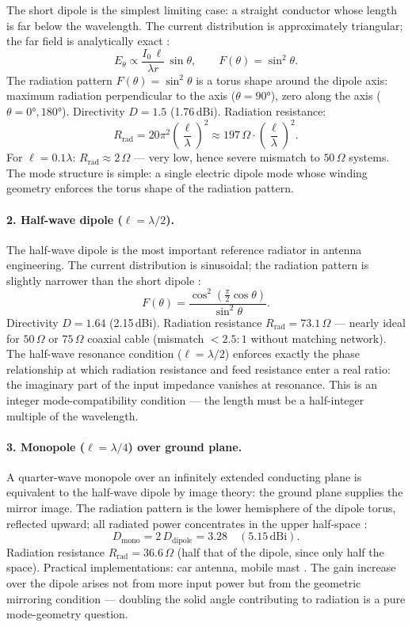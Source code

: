 The short dipole is the simplest limiting case: a straight conductor whose
length is far below the wavelength. The current distribution is
approximately triangular; the far field is analytically exact \EM:
\[
  E_\theta \propto \frac{I_0\,\ell}{\lambda r}\,\sin\theta,
  \qquad
  F(\theta) = \sin^2\theta.
\]
The radiation pattern $F(\theta) = \sin^2\theta$ is a torus shape around
the dipole axis: maximum radiation perpendicular to the axis
($\theta = 90°$), zero along the axis ($\theta = 0°, 180°$). Directivity
$D = 1.5$ (1.76\,dBi). Radiation resistance:
\[
  R_\mathrm{rad} = 20\pi^2\left(\frac{\ell}{\lambda}\right)^2 \approx 197\,\Omega
  \cdot \left(\frac{\ell}{\lambda}\right)^2.
\]
For $\ell = 0.1\lambda$: $R_\mathrm{rad} \approx 2\,\Omega$ --- very low,
hence severe mismatch to $50\,\Omega$ systems. The mode structure is simple:
a single electric dipole mode whose winding geometry enforces the torus
shape of the radiation pattern.

\paragraph{2. Half-wave dipole ($\ell = \lambda/2$).}

The half-wave dipole is the most important reference radiator in antenna
engineering. The current distribution is sinusoidal; the radiation pattern
is slightly narrower than the short dipole \EM:
\[
  F(\theta) = \frac{\cos^2\!\left(\frac{\pi}{2}\cos\theta\right)}{\sin^2\theta}.
\]
Directivity $D = 1.64$ (2.15\,dBi). Radiation resistance
$R_\mathrm{rad} = 73.1\,\Omega$ --- nearly ideal for $50\,\Omega$ or
$75\,\Omega$ coaxial cable (mismatch $< 2.5:1$ without matching network).
The half-wave resonance condition ($\ell = \lambda/2$) enforces exactly
the phase relationship at which radiation resistance and feed resistance
enter a real ratio: the imaginary part of the input impedance vanishes
at resonance. This is an integer mode-compatibility condition --- the
length must be a half-integer multiple of the wavelength.

\paragraph{3. Monopole ($\ell = \lambda/4$) over ground plane.}

A quarter-wave monopole over an infinitely extended conducting plane is
equivalent to the half-wave dipole by image theory: the ground plane
supplies the mirror image. The radiation pattern is the lower hemisphere
of the dipole torus, reflected upward; all radiated power concentrates in
the upper half-space \EM:
\[
  D_\mathrm{mono} = 2\,D_\mathrm{dipole} = 3.28 \quad (5.15\,\mathrm{dBi}).
\]
Radiation resistance $R_\mathrm{rad} = 36.6\,\Omega$ (half that of the
dipole, since only half the space). Practical implementations: car antenna,
mobile mast \cite{Balanis2016}. The gain increase over the dipole arises not
from more input power but from the geometric mirroring condition ---
doubling the solid angle contributing to radiation is a pure mode-geometry
question.

